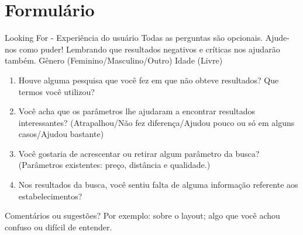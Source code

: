 \chapter{Formul{\'a}rio}
\label{ape:formulario}

Looking For - Experi{\^e}ncia do usu{\'a}rio
Todas as perguntas s{\~a}o opcionais. Ajude-nos como puder! Lembrando que resultados negativos e cr{\'i}ticas nos ajudar{\~a}o tamb{\'e}m.
G{\^e}nero
(Feminino/Masculino/Outro)
Idade
(Livre)

\begin{enumerate}
\item Houve alguma pesquisa que voc{\^e} fez em que n{\~a}o obteve resultados? Que termos voc{\^e} utilizou?

\item Voc{\^e} acha que os par{\^a}metros lhe ajudaram a encontrar resultados interessantes?
(Atrapalhou/N{\~a}o fez diferen\c{c}a/Ajudou pouco ou s{\'o} em alguns casos/Ajudou bastante)

\item Voc{\^e} gostaria de acrescentar ou retirar algum par{\^a}metro da busca?
(Par{\^a}metros existentes: pre\c{c}o, dist{\^a}ncia e qualidade.)

\item Nos resultados da busca, voc{\^e} sentiu falta de alguma informa\c{c}{\~a}o referente aos estabelecimentos?

\end{enumerate}

Coment{\'a}rios ou sugest{\~o}es?
Por exemplo: sobre o layout; algo que voc{\^e} achou confuso ou dif{\'i}cil de entender.

\singlespacing

\renewcommand{\arraystretch}{0.85}
\captionsetup{margin=1.0cm} %
